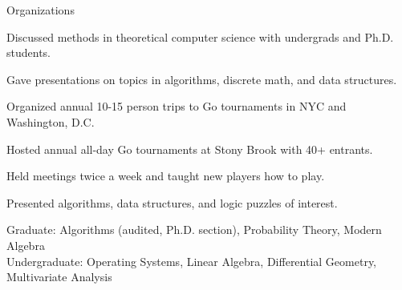 \documentclass{cv}
\begin{document}
\begin{cvsection}{Organizations}
  {
    \item Discussed methods in theoretical computer science with undergrads and Ph.D. students.
    \item Gave presentations on topics in algorithms, discrete math, and data structures.
  }
  {
    \item Organized annual 10-15 person trips to Go tournaments in NYC and Washington, D.C.
    \item Hosted annual all-day Go tournaments at Stony Brook with 40+ entrants.
    \item Held meetings twice a week and taught new players how to play.
  }
  {
    \item Presented algorithms, data structures, and logic puzzles of interest.
  } 
\end{cvsection}

Graduate: Algorithms (audited, Ph.D. section), Probability Theory, Modern Algebra \\
Undergraduate: Operating Systems, Linear Algebra, Differential Geometry, Multivariate Analysis
\end{document}
